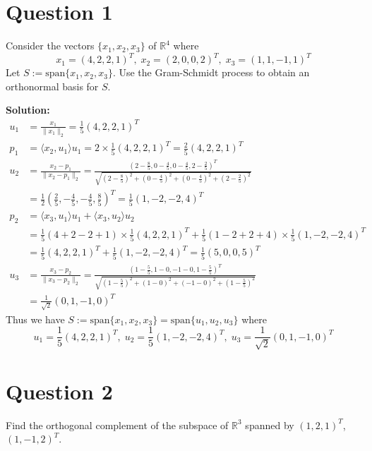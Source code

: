 \documentclass{article}
\begin{document}
\section*{Question 1}
Consider the vectors $\{x_1, x_2, x_3\}$ of $\mathbb{R}^4$ where
$$ x_1 = (4, 2, 2, 1)^T, \; x_2 = (2, 0, 0, 2)^T, \; x_3 = (1, 1, -1 ,1)^T $$
Let $S := \text{span} \{x_1, x_2, x_3\}$.
Use the Gram-Schmidt process to obtain an orthonormal basis for $S$.

\vspace{0.5cm}
\noindent\textbf{Solution:}
\begin{align*}
    u_1 &= \frac{x_1}{\|x_1\|_2} = \frac{1}{5} (4, 2, 2, 1)^T \\
    p_1 &= \langle x_2, u_1 \rangle u_1 = 2 \times \frac{1}{5} (4, 2, 2, 1)^T = \frac{2}{5} (4, 2, 2, 1)^T \\
    u_2 &= \frac{x_2 - p_1}{\|x_2 - p_1\|_2} = \frac{(2 - \frac{8}{5}, 0 - \frac{4}{5}, 0 - \frac{4}{5}, 2 - \frac{2}{5})^T}{\sqrt{(2 - \frac{8}{5})^2 + (0 - \frac{4}{5})^2 + (0 - \frac{4}{5})^2 + (2 - \frac{2}{5})^2}} \\
    &= \frac{1}{2} \left(\frac{2}{5}, -\frac{4}{5}, -\frac{4}{5}, \frac{8}{5}\right)^T = \frac{1}{5} (1, -2, -2, 4)^T \\
    p_2 &= \langle x_3, u_1 \rangle u_1 + \langle x_3, u_2 \rangle u_2 \\ 
    &= \frac{1}{5} (4 + 2 - 2 + 1) \times \frac{1}{5} (4, 2, 2, 1)^T + \frac{1}{5} (1 - 2 + 2 + 4) \times \frac{1}{5} (1, -2, -2, 4)^T \\
    &= \frac{1}{5} (4, 2, 2, 1)^T + \frac{1}{5} (1, -2, -2, 4)^T = \frac{1}{5} (5, 0, 0, 5)^T \\
    u_3 &= \frac{x_3 - p_2}{\|x_3 - p_2\|_2} = \frac{(1 - \frac{5}{5}, 1 - 0, -1 - 0, 1 - \frac{5}{5})^T}{\sqrt{(1 - \frac{5}{5})^2 + (1 - 0)^2 + (-1 - 0)^2 + (1 - \frac{5}{5})^2}} \\
    &= \frac{1}{\sqrt{2}} (0, 1, -1, 0)^T
\end{align*}
Thus we have $S := \text{span} \{x_1, x_2, x_3\} = \text{span} \{u_1, u_2, u_3\}$ where
$$ u_1 = \frac{1}{5} (4, 2, 2, 1)^T, \; u_2 =    \frac{1}{5} (1, -2, -2, 4)^T, \; u_3 = \frac{1}{\sqrt{2}} (0, 1, -1, 0)^T $$

\newpage
\section*{Question 2}
Find the orthogonal complement of the subspace of $\mathbb{R}^3$ spanned by $(1, 2, 1)^T$, $(1, -1, 2)^T$.
\end{document}
